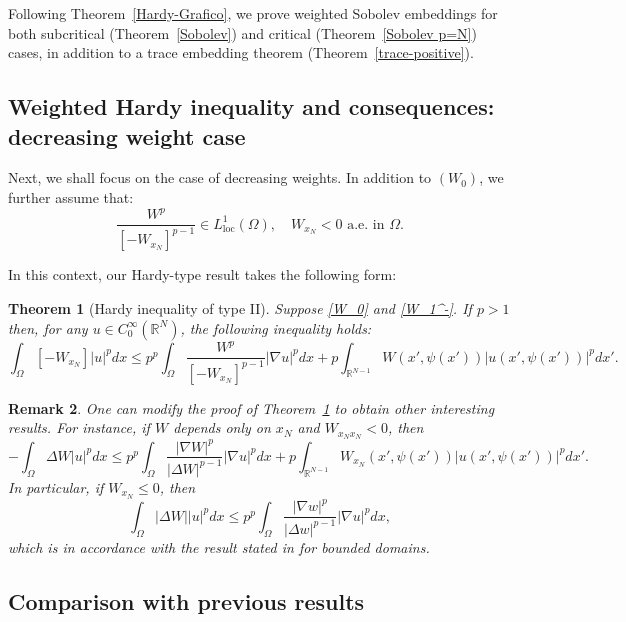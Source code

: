 \documentclass[12pt]{amsart}
\newtheorem{theorem}{Theorem}[section]
\newtheorem{remark}[theorem]{Remark}
\theoremstyle{definition}
\theoremstyle{plain}
\newcommand{\dint}{\int_{\Omega}}
\begin{document}
Following Theorem~\ref{Hardy-Grafico}, we prove weighted Sobolev embeddings for both subcritical (Theorem~\ref{Sobolev}) and critical (Theorem~\ref{Sobolev p=N}) cases, in addition to a trace embedding theorem (Theorem~\ref{trace-positive}).

 \subsection{Weighted Hardy inequality and consequences: decreasing weight case}

Next, we shall focus on the case of decreasing weights. In addition to $(W_0)$,
we further assume that:
\begin{equation}\label{W_1^-}\tag{$W_1^-$}
\frac{W^p}{[-W_{x_N}]^{p-1}} \in L^1_{\mathrm{loc}}(\Omega) ,\quad W_{x_N} < 0 
\text{ a.e. in } \Omega.\end{equation} 

In this context, our Hardy-type result takes the following form: 
	\begin{theorem}[Hardy inequality of type II]\label{Hardy-Type II} Suppose  \eqref{W_0} and \eqref{W_1^-}. If $p>1$ then, for any $u \in C_0^\infty(\mathbb{R}^N)$, 
    the following inequality holds:
    \begin{equation}\label{Hardy-Geral-Grafico-II}
         \int_{\Omega} [-W_{x_N}]|u|^pdx \leq p^p\int_{\Omega} \frac{W^p}
         {\left[-W_{x_N}\right]^{p-1}}|\nabla u|^pdx +  p	\int_{\mathbb{R}^{N-1}} 
         W(x',\psi(x'))|u(x',\psi(x'))|^pdx'.
  \end{equation}
		\end{theorem}

\begin{remark}
    One can modify the proof of Theorem~\ref{Hardy-Type II} to obtain 
    other interesting results. 
    For instance, if $W$ depends only on $x_N$ 
    and  $W_{x_Nx_N}<0$, then
	$$
	-\dint \Delta W|u|^pdx   \leq p^p\dint \frac{|\nabla W|^{p}}
    {|\Delta W|^{p-1}}|\nabla u|^pdx +p	\int_{\mathbb{R}^{N-1}} 
    W_{x_N}(x',\psi(x'))|u(x',\psi(x'))|^pdx'.
$$
In particular, if $W_{x_N}\leq0$, then 
$$
	\dint |\Delta W||u|^pdx
	\leq p^p\dint \frac{|\nabla w|^{p}}{|\Delta w|^{p-1}}|\nabla u|^pdx,
$$
which is in accordance with the result stated in \cite[Theorem 1]{Davies-Hinz} for bounded domains. 	
\end{remark}
        
\subsection{Comparison with previous results}
\end{document}
